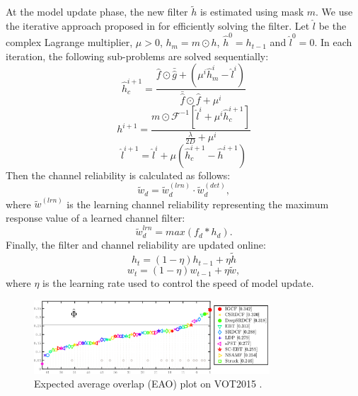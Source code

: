\documentclass[review]{elsarticle}
\begin{document}
At the model update phase, the new filter $\tilde{h}$ is estimated using mask $m$. We use the iterative approach proposed in \cite{Lukezic2017DiscriminativeCF} for efficiently solving the filter. Let $\hat{l}$ be the complex Lagrange multiplier, $\mu > 0$, $h_m=m \odot h$, $\hat{h}^0 = h_{t-1}$ and $\hat{l}^0 = 0$. In each iteration, the following sub-problems are solved sequentially:
\begin{equation} \label{eq:h1}
\hat{h}_c^{i+1} = \frac{\hat{f} \odot \bar{\hat{g}} +(\mu^i \hat{h}_m^i - \hat{l}^i)}{\bar{\hat{f}} \odot \hat f + \mu^i}
\end{equation}
\begin{equation}
h^{i+1} = \frac{m \odot \mathcal{F}^{-1}[\hat{l}^i + \mu^i\hat{h}_c^{i+1}]}{\frac{\lambda}{2D} + \mu^i}
\end{equation}
\begin{equation} \label{eq:h3}
\hat{l}^{i+1} = \hat{l}^i + \mu(\hat{h}_c^{i+1} - \hat{h}^{i+1})
\end{equation}
Then the channel reliability \cite{Lukezic2017DiscriminativeCF} is calculated as follows: 
\begin{equation} \label{eq:c}
\tilde w_d = \tilde w_d^{(lrn)} \cdot \tilde w_d^{(det)},
\end{equation}
where $\tilde{w}^{(lrn)}$ is the learning channel reliability representing the maximum response value of a learned channel filter:
\begin{equation} \label{eq:lrn}
\tilde{w}_d^{lrn} = max(f_d * h_d).
\end{equation}
Finally, the filter and channel reliability are updated online:
\begin{equation} \label{eq:update1}
h_t = (1 - \eta)h_{t-1} + \eta \tilde{h}
\end{equation}
\begin{equation} \label{eq:update2}
w_t = (1-\eta)w_{t-1} + \eta \tilde{w},
\end{equation}
where $\eta$ is the learning rate used to control the speed of model update.

\begin{figure}
    \centering
    \includegraphics[width=8.8cm]{images/vot/eao_rank_vot2015.png}
    \caption{Expected average overlap (EAO) plot on VOT2015 \cite{Kristan2015TheVO}.}
    \label{fig:vot15}
\end{figure}
\end{document}
